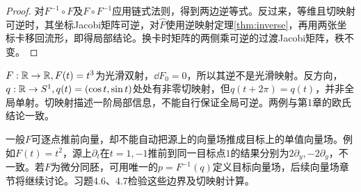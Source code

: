 \begin{proof}
对$F^{-1}\circ F$及$F\circ F^{-1}$应用链式法则，得到两边逆等式。反过来，等维且切映射可逆时，其坐标Jacobi矩阵可逆，对$\widehat F$使用逆映射定理\ref{thm:inverse}，再用两张坐标卡移回流形，即得局部结论。换卡时矩阵的两侧乘可逆的过渡Jacobi矩阵，秩不变。
\end{proof}
\begin{example}[微分退化不等于映射不单射]
$F:\mathbb{R}\to\mathbb{R},F(t)=t^3$为光滑双射，$\dd F_0=0$，所以其逆不是光滑映射。反方向，$q:\mathbb{R}\to S^1,q(t)=(\cos t,\sin t)$处处有非零切映射，但$q(t+2\pi)=q(t)$，并非全局单射。切映射描述一阶局部信息，不能自行保证全局可逆。两例与第1章的欧氏结论一致。
\end{example}
一般$F$可逐点推前向量，却不能自动把源上的向量场推成目标上的单值向量场。例如$F(t)=t^2$，源上$\partial_t$在$t=1,-1$推前到同一目标点$1$的结果分别为$2\partial_y,-2\partial_y$，不一致。若$F$为微分同胚，可用唯一的$p=F^{-1}(q)$定义目标向量场，后续向量场章节将继续讨论。习题4.6、4.7检验这些边界及切映射计算。
